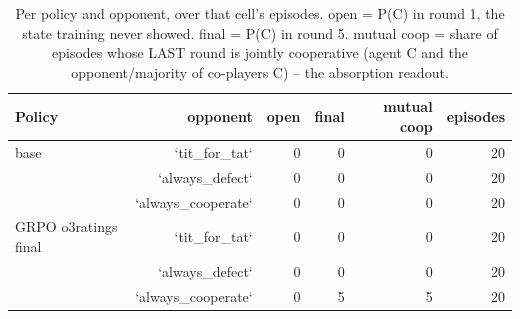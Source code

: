 \begin{table}[t]
\centering
\caption{Per policy and opponent, over that cell's episodes. open = P(C) in round 1, the state training never showed. final = P(C) in round 5. mutual coop = share of episodes whose LAST round is jointly cooperative (agent C and the opponent/majority of co-players C) -- the absorption readout.}
\label{tab:mr-outcomes}
\small
\setlength{\tabcolsep}{3.5pt}
\begin{tabular}{lrrrrr}
\toprule
Policy & opponent & open & final & mutual coop & episodes \\
\midrule
base & `tit_for_tat` & 0 & 0 & 0 & 20 \\
 & `always_defect` & 0 & 0 & 0 & 20 \\
 & `always_cooperate` & 0 & 0 & 0 & 20 \\
GRPO o3ratings final & `tit_for_tat` & 0 & 0 & 0 & 20 \\
 & `always_defect` & 0 & 0 & 0 & 20 \\
 & `always_cooperate` & 0 & 5 & 5 & 20 \\
\bottomrule
\end{tabular}
\end{table}

